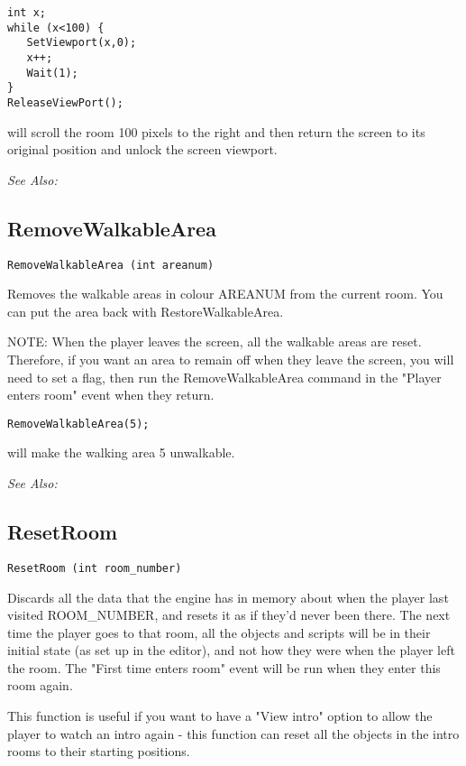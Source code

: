 \begin{verbatim}
int x;
while (x<100) {
   SetViewport(x,0);
   x++;
   Wait(1);
}
ReleaseViewPort();
\end{verbatim}
will scroll the room 100 pixels to the right and then return the screen to its
original position and unlock the screen viewport.

\it{See Also:} 


\subsection{RemoveWalkableArea}\label{RemoveWalkableArea}%

\begin{verbatim}
RemoveWalkableArea (int areanum)
\end{verbatim}
Removes the walkable areas in colour AREANUM from the current room. You can
put the area back with RestoreWalkableArea.

NOTE: When the player leaves the screen, all the walkable areas are reset.
Therefore, if you want an area to remain off when they leave the screen,
you will need to set a flag, then run the RemoveWalkableArea command in
the "Player enters room" event when they return.

\begin{verbatim}
RemoveWalkableArea(5);
\end{verbatim}
will make the walking area 5 unwalkable.

\it{See Also:} 


\subsection{ResetRoom}\label{ResetRoom}%

\begin{verbatim}
ResetRoom (int room_number)
\end{verbatim}
Discards all the data that the engine has in memory about when the player
last visited ROOM_NUMBER, and resets it as if they'd never been there. The
next time the player goes to that room, all the objects and scripts will
be in their initial state (as set up in the editor), and not how they were
when the player left the room. The "First time enters room" event will be
run when they enter this room again.

This function is useful if you want to have a "View intro" option to allow
the player to watch an intro again - this function can reset all the
objects in the intro rooms to their starting positions.

